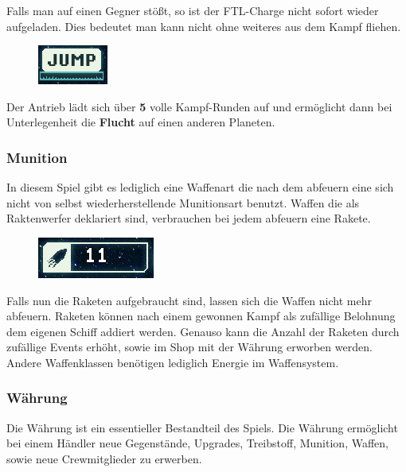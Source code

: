 \documentclass[fontsize=12pt,paper=a4,twoside]{scrartcl}
\begin{document}
Falls man auf einen Gegner stößt, so ist der FTL-Charge nicht sofort wieder aufgeladen. Dies bedeutet man kann nicht ohne weiteres aus dem Kampf fliehen.
\begin{figure}[H]
\centering
\includegraphics[width=0.4\linewidth]{DasSpiel/Ui/ftl_charge_combat.png}
\end{figure}
Der Antrieb lädt sich über \textbf{5} volle Kampf-Runden auf und ermöglicht dann bei Unterlegenheit die \textbf{Flucht} auf einen anderen Planeten.


\subsubsection{Munition}
In diesem Spiel gibt es lediglich eine Waffenart die nach dem abfeuern eine sich nicht von selbst wiederherstellende Munitionsart benutzt. Waffen die als Raktenwerfer deklariert sind, verbrauchen bei jedem abfeuern eine Rakete.

\begin{figure}[H]
\centering
\includegraphics[width=0.4\linewidth]{DasSpiel/Ui/Rocket.png}
\end{figure}

Falls nun die Raketen aufgebraucht sind, lassen sich die Waffen nicht mehr abfeuern. Raketen können nach einem gewonnen Kampf als zufällige Belohnung dem eigenen Schiff addiert werden. Genauso kann die Anzahl der Raketen durch zufällige Events erhöht, sowie im Shop mit der Währung erworben werden. Andere Waffenklassen benötigen lediglich Energie im Waffensystem.

\subsubsection{Währung}
Die Währung ist ein essentieller Bestandteil des Spiels. Die Währung ermöglicht bei einem Händler neue Gegenstände, Upgrades, Treibstoff, Munition, Waffen, sowie neue Crewmitglieder zu erwerben.  
\end{document}
